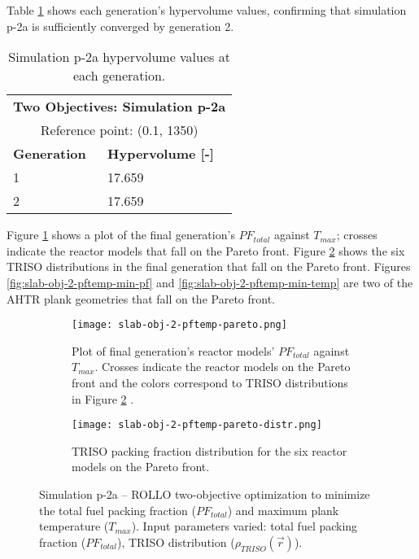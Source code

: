 Table \ref{tab:p2a-hypervolume} shows each generation's hypervolume values, 
confirming that simulation p-2a is sufficiently converged by generation 2. 
\begin{table}[htbp!]
    \centering
    \onehalfspacing
    \caption{Simulation p-2a hypervolume values at each generation.}
	\label{tab:p2a-hypervolume}
    \footnotesize
    \begin{tabular}{ll}
    \hline 
    \multicolumn{2}{c}{\textbf{Two Objectives: Simulation p-2a}} \\
    \multicolumn{2}{c}{Reference point: (0.1, 1350)} \\
    \hline 
    \textbf{Generation} & \textbf{Hypervolume [-]} \\
    \hline
    1 & 17.659 \\
    2 & 17.659 \\
    \hline
    \end{tabular}
\end{table}
Figure \ref{fig:slab-obj-2-pftemp-pareto} shows a plot of the final generation's 
$PF_{total}$ against $T_{max}$; crosses indicate the reactor models that 
fall on the Pareto front.
Figure \ref{fig:slab-obj-2-pftemp-pareto-distr} shows the six TRISO distributions in 
the final generation that fall on the Pareto front.
Figures \ref{fig:slab-obj-2-pftemp-min-pf} and \ref{fig:slab-obj-2-pftemp-min-temp} 
are two of the \gls{AHTR} plank geometries that fall on the Pareto front. 
\begin{figure}[htbp!]
    \centering
    \begin{subfigure}{\textwidth}
        \texttt{[image: slab-obj-2-pftemp-pareto.png]}
        \caption{Plot of final generation's reactor models' $PF_{total}$ against 
        $T_{max}$. Crosses indicate the reactor models on the Pareto front and the 
        colors correspond to TRISO distributions in Figure 
        \ref{fig:slab-obj-2-pftemp-pareto-distr} .}
        \label{fig:slab-obj-2-pftemp-pareto} 
    \end{subfigure}
    \begin{subfigure}{\textwidth}
        \texttt{[image: slab-obj-2-pftemp-pareto-distr.png]}
        \caption{TRISO packing fraction distribution for the six reactor models on the 
        Pareto front.}
        \label{fig:slab-obj-2-pftemp-pareto-distr} 
    \end{subfigure}
    \caption{Simulation p-2a -- ROLLO two-objective optimization to minimize the total 
    fuel packing fraction ($PF_{total}$) and maximum plank temperature ($T_{max}$). 
    Input parameters varied: total fuel packing fraction ($PF_{total}$), 
    \gls{TRISO} distribution ($\rho_{TRISO}(\vec{r})$).}
    \label{fig:slab-obj-2-pftemp}
\end{figure}
